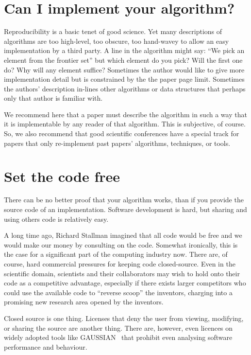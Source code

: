 \documentclass[conference]{IEEEtran}
\begin{document}
\section{Can I implement your algorithm?}

Reproducibility is a basic tenet of good science. Yet many
descriptions of algorithms are too high-level, too obscure, too
hand-wavey to allow an easy implementation by a third party. A line in
the algorithm might say: ``We pick an element from the frontier set''
but which element do you pick? Will the first one do? Why will any
element suffice? Sometimes the author would like to give more
implementation detail but is constrained by the the paper page
limit. Sometimes the authors' description in-lines other algorithms or
data structures that perhaps only that author is familiar with.

We recommend here that a paper must describe the algorithm in such a
way that it is implementable by any reader of that algorithm. This is
subjective, of course. So, we also recommend that good scientific
conferences have a special track for papers that only re-implement
past papers' algorithms, techniques, or tools.


\section{Set the code free} 

There can be no better proof that your algorithm works, than if you
provide the source code of an implementation. Software development is
hard, but sharing and using others code is relatively easy.

A long time ago, Richard Stallman imagined that all code would be free
and we would make our money by consulting on the code.
Somewhat ironically, this is the case for a significant part of the
computing industry now. There are, of course, hard commercial
pressures for keeping code closed-source. Even in the scientific
domain, scientists and their collaborators may wish to hold onto their
code as a competitive advantage, especially if there exists larger
competitors who could use the available code to ``reverse scoop'' the
inventors, charging into a promising new research area opened by the
inventors.

Closed source is one thing. Licenses that deny the user from viewing,
modifying, or sharing the source are another thing. There are, however, even
licences on widely adopted tools like GAUSSIAN~\cite{Giles2004} that
prohibit even analysing software performance and behaviour.
 
\end{document}
